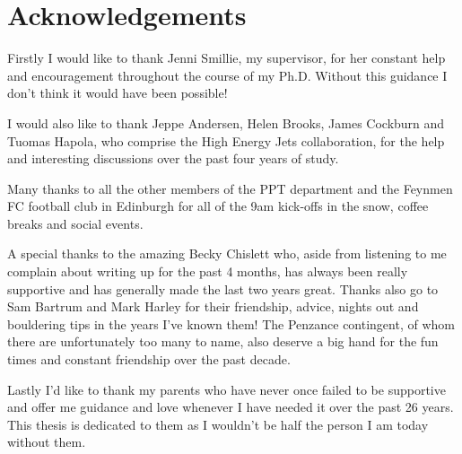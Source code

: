 \chapter*{Acknowledgements}

\noindent

\normalsize

Firstly I would like to thank Jenni Smillie, my supervisor, for her constant help and encouragement
throughout the course of my Ph.D.  Without this guidance I don't think it would have been possible!

I would also like to thank Jeppe Andersen, Helen Brooks, James Cockburn and Tuomas Hapola, who comprise
the High Energy Jets collaboration, for the help and interesting discussions over the past four years of study.

Many thanks to all the other members of the PPT department and the Feynmen FC football club in
Edinburgh for all of the 9am kick-offs in the snow, coffee breaks and social events.

A special thanks to the amazing Becky Chislett who, aside from listening to me complain about writing up
for the past 4 months, has always been really supportive and has generally made the last two years great.  Thanks
also go to Sam Bartrum and Mark Harley for their friendship, advice, nights out and bouldering tips in
the years I've known them!  The Penzance contingent, of whom there are unfortunately too many to name, also
deserve a big hand for the fun times and constant friendship over the past decade.

Lastly I'd like to thank my parents who have never once failed to be supportive and offer me guidance and love
whenever I have needed it over the past 26 years.  This thesis is dedicated to them as I wouldn't be half
the person I am today without them.

